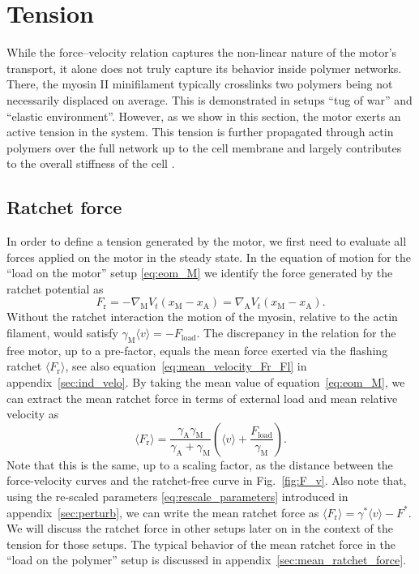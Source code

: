\documentclass[aps,pre,twocolumn,showpacs,showkeys,superscriptaddress,floatfix]{revtex4-1}
\begin{document}
\section{Tension}
\label{sec:tension}
While the force--velocity relation captures the non-linear nature of the motor's transport, 
it alone does not truly capture its behavior inside polymer networks.
There, the myosin II minifilament typically crosslinks two polymers being not necessarily displaced on average.
This is demonstrated in setups ``tug of war'' and ``elastic environment''. 
However, as we show in this section, the motor exerts an active tension in the system.
This tension is further propagated through actin polymers over the full network up to the cell membrane and largely contributes to the overall stiffness of the cell \cite{chugh2017actin,ma2012nonmuscle,monier2010actomyosin}.

\subsection{Ratchet force} 
In order to define a tension generated by the motor, we first need to evaluate all forces applied on the motor in the steady state. 
In the equation of motion for the ``load on the motor'' setup \eqref{eq:eom_M} we identify the force generated by the ratchet potential as
\begin{equation}
F_\text{r} = - \nabla_\text{M} V_t( x_\text{M} - x_\text{A} ) = \nabla_\text{A} V_t(x_\text{M} - x_\text{A} ) . 
\label{eq:ratchet_force}
\end{equation}
Without the ratchet interaction the motion of the myosin, relative to the actin filament, would satisfy $ \gamma_\text{M}\langle v \rangle = -F_\text{load}$. 
The discrepancy in the relation for the free motor, up to a pre-factor, equals the mean force exerted via the flashing ratchet $\langle F_\text{r}\rangle$, 
see also equation~\eqref{eq:mean_velocity_Fr_Fl} in appendix~\ref{sec:ind_velo}.
By taking the mean value of equation~\eqref{eq:eom_M}, 
we can extract the mean ratchet force in terms of external load and mean relative velocity as 
\begin{equation}
\langle F_\text{r} \rangle = \frac{\gamma_\text{A}\gamma_\text{M}}{\gamma_\text{A} + \gamma_\text{M} } \left(\langle v \rangle + \frac{F_\text{load}}{\gamma_\text{M}}\right) .
\label{eq:mean_ratchet_force}
\end{equation}
Note that this is the same, up to a scaling factor, as the distance between the force-velocity curves and the ratchet-free curve in Fig.~\ref{fig:F_v}. 
Also note that, using the re-scaled parameters \eqref{eq:rescale_parameters} introduced in appendix~\ref{sec:perturb}, 
we can write the mean ratchet force as $\langle F_\text{r} \rangle = \gamma^* \langle v \rangle - F^*$.
We will discuss the ratchet force in other setups later on in the context of the tension for those setups.
The typical behavior of the mean ratchet force in the ``load on the polymer'' setup is discussed in appendix~\ref{sec:mean_ratchet_force}.
\end{document}
